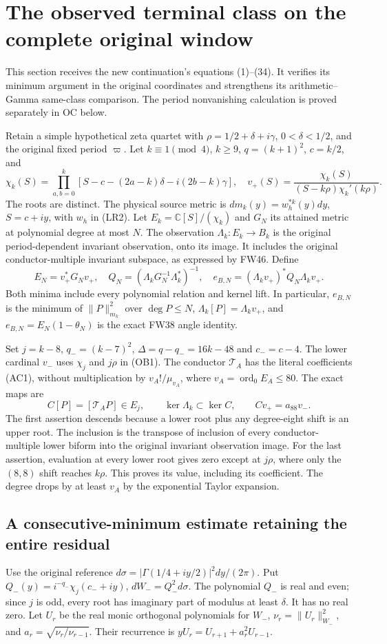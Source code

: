 \section{The observed terminal class on the complete original window}
This section receives the new continuation's equations (1)--(34).
It verifies its minimum argument in the original coordinates and
strengthens its arithmetic--Gamma same-class comparison. The period
nonvanishing calculation is proved separately in OC below.

Retain a simple hypothetical zeta quartet with
$\rho=1/2+\delta+i\gamma$, $0<\delta<1/2$, and the original fixed
period $\varpi$. Let $k\equiv1\pmod4$, $k\ge9$,
$q=(k+1)^2$, $c=k/2$, and
\[
 \chi_k(S)=\prod_{a,b=0}^k[S-c-(2a-k)\delta-i(2b-k)\gamma],\quad
 v_+(S)=\frac{\chi_k(S)}{(S-k\rho)\chi_k'(k\rho)}.\tag{OB1}
\]
The roots are distinct. The physical source metric is
$dm_k(y)=w_h^{*k}(y)dy$, $S=c+iy$, with $w_h$ in (LR2).
Let $E_k=\mathbb C[S]/(\chi_k)$ and $G_N$ its attained metric at
polynomial degree at most $N$. The observation $\Lambda_k:E_k\to B_k$
is the original period-dependent invariant observation, onto its image.
It includes the original conductor-multiple invariant subspace, as
expressed by FW46. Define
\[
 E_N=v_+^*G_Nv_+,\quad Q_N=(\Lambda_kG_N^{-1}\Lambda_k^*)^{-1},
 \quad e_{B,N}=(\Lambda_kv_+)^*Q_N\Lambda_kv_+ .\tag{OB2}
\]
Both minima include every polynomial relation and kernel lift. In
particular, $e_{B,N}$ is the minimum of $\|P\|_{m_k}^2$ over
$\deg P\le N$, $\Lambda_k[P]=\Lambda_kv_+$, and
$e_{B,N}=E_N(1-\theta_N)$ is the exact FW38 angle identity.

Set $j=k-8$, $q_-=(k-7)^2$, $\Delta=q-q_-=16k-48$ and $c_-=c-4$.
The lower cardinal $v_-$ uses $\chi_j$ and $j\rho$ in (OB1).
The conductor $\mathcal T_A$ has the literal coefficients (AC1),
without multiplication by $v_A!/\mu_{v_A}$, where
$v_A=\operatorname{ord}_0E_A\le80$. The exact maps are
\[
 C[P]=[\mathcal T_AP]\in E_j,\qquad
 \ker\Lambda_k\subset\ker C,\qquad Cv_+=a_{88}v_- .\tag{OB3}
\]
The first assertion descends because a lower root plus any degree-eight
shift is an upper root. The inclusion is the transpose of inclusion
of every conductor-multiple lower biform into the original invariant
observation image. For the last assertion, evaluation at every lower
root gives zero except at $j\rho$, where only the $(8,8)$ shift
reaches $k\rho$. This proves its value, including its coefficient.
The degree drops by at least $v_A$ by the exponential Taylor expansion.

\subsection{A consecutive-minimum estimate retaining the entire residual}
Use the original reference $d\sigma=|\Gamma(1/4+iy/2)|^2dy/(2\pi)$.
Put $Q_-(y)=i^{-q_-}\chi_j(c_-+iy)$, $dW_-=Q_-^2d\sigma$.
The polynomial $Q_-$ is real and even; since $j$ is odd, every root
has imaginary part of modulus at least $\delta$. It has no real zero.
Let $U_r$ be the real monic orthogonal polynomials for $W_-$,
$\nu_r=\|U_r\|_{W_-}^2$, and $a_r=\sqrt{\nu_r/\nu_{r-1}}$.
Their recurrence is $yU_r=U_{r+1}+a_r^2U_{r-1}$.


